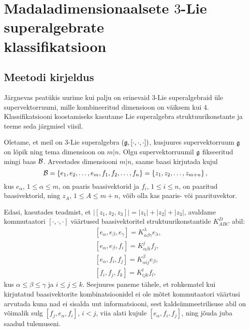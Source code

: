 

\section[Madaladimensionaalsete \texorpdfstring{$3$}{3}-Lie superalgebrate
klassifikatsioon]{Madaladimensionaalsete \texorpdfstring{$3$}{3}-Lie
superalgebrate \\ klassifikatsioon}

\subsection{Meetodi kirjeldus}

Järgnevas peatükis uurime kui palju on erinevaid $3$-Lie superalgebraid üle
supervektorruumi, mille kombineeritud dimensioon on väiksem kui $4$.
Klassifikatsiooni koostamiseks kasutame Lie superalgebra struktuurikonstante
ja teeme seda järgmisel viisil.

Oletame, et meil on 3-Lie superalgebra $(\mathfrak{g}, [\cdot, \cdot, \cdot])$,
kusjuures supervektorruum $\mathfrak{g}$ on lõpik ning tema dimensioon on $m|n$. Olgu
supervektorruumil $\mathfrak{g}$ fikseeritud mingi baas $\mathcal{B}$. Arvestades dimensiooni
$m|n$, saame baasi kirjutada kujul
\[
    \mathcal{B} = \left\{ e_1, e_2, \dots, e_m, f_1, f_2, \dots, f_n \right\} =
         \left\{ z_1, z_2, \dots, z_{m+n} \right\},
\]
kus $e_\alpha$, $1 \leq \alpha \leq m$, on paaris baasivektorid ja
$f_i$, $1 \leq i \leq n$, on paaritud baasivektorid, ning $z_A$,
$1 \leq A \leq m+n$, võib olla kas paaris- või paarituvektor.

Edasi, kasutades teadmist, et $|[z_1, z_2, z_3]| = |z_1| + |z_2| + |z_3|$,
avaldame kommutaatori $[\cdot, \cdot, \cdot]$ väärtused baasivektoritel
struktuurikonstantide $K_{ABC}^D$ abil:
\begin{align*}
    &[e_\alpha, e_\beta, e_\gamma] =
        K_{\alpha \beta \gamma}^\lambda e_\lambda, \\
    &[e_\alpha, e_\beta, f_i] = K_{\alpha \beta i}^j f_j, \\
    &[e_\alpha, f_i, f_j] = K_{\alpha i j}^\beta e_\beta, \\
    &[f_i, f_j, f_k] = K_{i j k}^l f_l,
\end{align*}
kus $\alpha \leq \beta \leq \gamma$ ja $i \leq j \leq  k$.
Seejuures paneme tähele, et rohkematel kui kirjutatud baasivektorite
kombinatsioonidel ei ole mõtet kommutaatori väärtusi arvutada kuna nad ei
sisalda uut informatsiooni, sest kaldsümmeetrilisuse abil on võimalik
sulg $[f_j, e_\alpha, f_i]$, $i < j$, viia alati kujule $[e_\alpha, f_i, f_j]$,
ning jõuda juba saadud tulemuseni.

